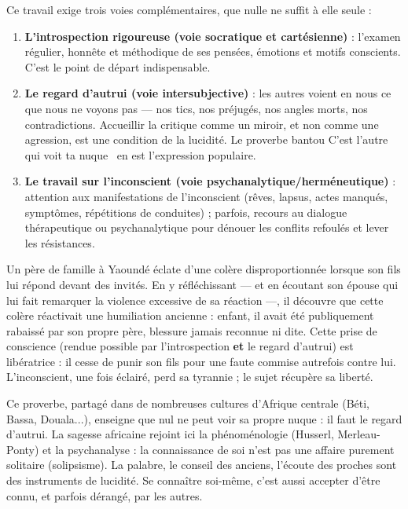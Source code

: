 \documentclass[11pt]{article}
\begin{document}
Ce travail exige trois voies complémentaires, que nulle ne suffit à elle seule :
\begin{enumerate}
\item \textbf{L'introspection rigoureuse (voie socratique et cartésienne)} : l'examen régulier, honnête et méthodique de ses pensées, émotions et motifs conscients. C'est le point de départ indispensable.
\item \textbf{Le regard d'autrui (voie intersubjective)} : les autres voient en nous ce que nous ne voyons pas — nos tics, nos préjugés, nos angles morts, nos contradictions. Accueillir la critique comme un miroir, et non comme une agression, est une condition de la lucidité. Le proverbe bantou \guillemotleft C'est l'autre qui voit ta nuque \guillemotright\ en est l'expression populaire.
\item \textbf{Le travail sur l'inconscient (voie psychanalytique/herméneutique)} : attention aux manifestations de l'inconscient (rêves, lapsus, actes manqués, symptômes, répétitions de conduites) ; parfois, recours au dialogue thérapeutique ou psychanalytique pour dénouer les conflits refoulés et lever les résistances.
\end{enumerate}

\begin{exemplebox}
Un père de famille à Yaoundé éclate d'une colère disproportionnée lorsque son fils lui répond devant des invités. En y réfléchissant — et en écoutant son épouse qui lui fait remarquer la violence excessive de sa réaction —, il découvre que cette colère réactivait une humiliation ancienne : enfant, il avait été publiquement rabaissé par son propre père, blessure jamais reconnue ni dite. Cette prise de conscience (rendue possible par l'introspection \textbf{et} le regard d'autrui) est libératrice : il cesse de punir son fils pour une faute commise autrefois contre lui. L'inconscient, une fois éclairé, perd sa tyrannie ; le sujet récupère sa liberté.
\end{exemplebox}

\begin{savaistu}
Ce proverbe, partagé dans de nombreuses cultures d'Afrique centrale (Béti, Bassa, Douala...), enseigne que nul ne peut voir sa propre nuque : il faut le regard d'autrui. La sagesse africaine rejoint ici la phénoménologie (Husserl, Merleau-Ponty) et la psychanalyse : la connaissance de soi n'est pas une affaire purement solitaire (solipsisme). La palabre, le conseil des anciens, l'écoute des proches sont des instruments de lucidité. Se connaître soi-même, c'est aussi accepter d'être connu, et parfois dérangé, par les autres.
\end{savaistu}
\end{document}
